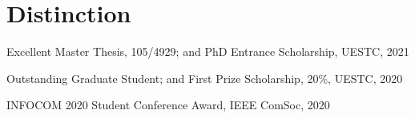 \vspace{-8pt}
\section*{Distinction}
\vspace{-4pt}
\indent



Excellent Master Thesis, 105/4929; and PhD Entrance Scholarship, UESTC, 2021

Outstanding Graduate Student; and First Prize Scholarship, 20\%, UESTC, 2020

INFOCOM 2020 Student Conference Award, IEEE ComSoc, 2020

